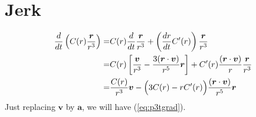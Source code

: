 \documentclass[11pt]{jsarticle}
\begin{document}
\section{Jerk}
\begin{equation}
\begin{aligned}
\frac{d}{dt} \left( C(r) \frac{\bm r}{r^3} \right)
	=& C(r) \frac{d}{dt} \frac{\bm r}{r^3} + \left(\frac{dr}{dt} C'(r) \right) \frac{\bm r}{r^3}  \\
	=& C(r) \left[ \frac{\bm v}{r^3} - \frac{3 (\bm r \cdot \bm v)}{r^5} \bm r \right] + C'(r) \frac{(\bm r \cdot \bm v)}{r} \frac{\bm r}{r^3} \\
	=&  \frac{C(r)}{r^3} \bm v - \Bigl( 3 C(r) - r C'(r) \Bigr) \frac{(\bm r \cdot \bm v)}{r^5} \bm r 
\end{aligned}
\end{equation}
Just replacing $\bm v$ by $\bm a$, we will have (\ref{eq:p3tgrad}).
\end{document}
